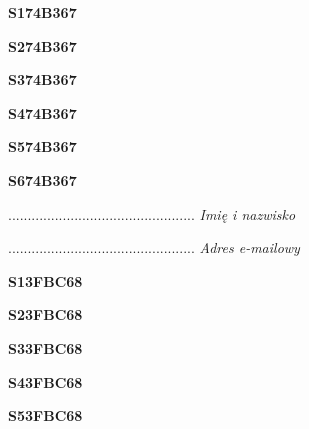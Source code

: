 \begin{turn}{90}\huge \textbf{S174B367}\end{turn}

\begin{turn}{90}\huge \textbf{S274B367}\end{turn}

\begin{turn}{90}\huge \textbf{S374B367}\end{turn}

\begin{turn}{90}\huge \textbf{S474B367}\end{turn}

\begin{turn}{90}\huge \textbf{S574B367}\end{turn}

\begin{turn}{90}\huge \textbf{S674B367}\end{turn}

\begin{turn}{90}\begin{minipage}{\linewidth} \vspace{20mm} ................................................  \textit{Imię i nazwisko}\end{minipage}\end{turn}

\begin{turn}{90}\begin{minipage}{\linewidth} \vspace{20mm} ................................................  \textit{Adres e-mailowy}\end{minipage}\end{turn}

\begin{turn}{90}\huge \textbf{S13FBC68}\end{turn}

\begin{turn}{90}\huge \textbf{S23FBC68}\end{turn}

\begin{turn}{90}\huge \textbf{S33FBC68}\end{turn}

\begin{turn}{90}\huge \textbf{S43FBC68}\end{turn}

\begin{turn}{90}\huge \textbf{S53FBC68}\end{turn}

